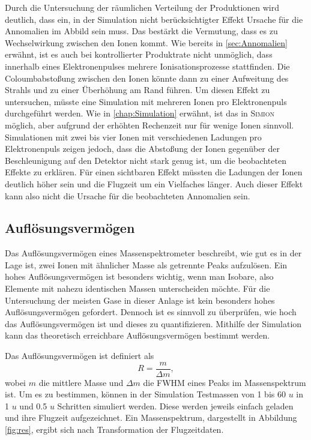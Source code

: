 Durch die Untersuchung der räumlichen Verteilung der Produktionen wird deutlich, dass ein, in der Simulation nicht berücksichtigter Effekt Ursache für die Annomalien im Abbild sein muss. Das bestärkt die Vermutung, dass es zu Wechselwirkung zwischen den Ionen kommt. Wie bereits in \ref{sec:Annomalien} erwähnt, ist es auch bei kontrollierter Produktrate nicht unmöglich, dass innerhalb eines Elektronenpulses mehrere Ionisationsprozesse stattfinden. Die Coloumbabstoßung zwischen den Ionen könnte dann zu einer Aufweitung des Strahls und zu einer Überhöhung am Rand führen. Um diesen Effekt zu untersuchen, müsste eine Simulation mit mehreren Ionen pro Elektronenpuls durchgeführt werden. Wie in \ref{chap:Simulation} erwähnt, ist das in \textsc{Simion} möglich, aber aufgrund der erhöhten Rechenzeit nur für wenige Ionen sinnvoll. Simulationen mit zwei bis vier Ionen mit verschiedenen Ladungen pro Elektronenpuls zeigen jedoch, dass die Abstoßung der Ionen gegenüber der Beschleunigung auf den Detektor nicht stark genug ist, um die beobachteten Effekte zu erklären. Für einen sichtbaren Effekt müssten die Ladungen der Ionen deutlich höher sein und die Flugzeit um ein Vielfaches länger. Auch dieser Effekt kann also nicht die Ursache für die beobachteten Annomalien sein.

\label{sec:delay}
\subsection{Auflösungsvermögen}
Das Auflösungsvermögen eines Massenspektrometer beschreibt, wie gut es in der Lage ist, zwei Ionen mit ähnlicher Masse als getrennte Peaks aufzulösen. Ein hohes Auflösungsvermögen ist besonders wichtig, wenn man Isobare, also Elemente mit nahezu identischen Massen unterscheiden möchte. Für die Untersuchung der meisten Gase in dieser Anlage ist kein besonders hohes Auflösungsvermögen gefordert. Dennoch ist es sinnvoll zu überprüfen, wie hoch das Auflösungsvermögen ist und dieses zu quantifizieren. Mithilfe der Simulation kann das theoretisch erreichbare Auflösungsvermögen bestimmt werden. 

Das Auflösungsvermögen ist definiert als 
\begin{equation}
    R = \frac{m}{\Delta m},
    \label{eq:res}
\end{equation}
wobei $m$ die mittlere Masse und $\Delta m$ die FWHM eines Peaks im Massenspektrum ist. Um es zu bestimmen, können in der Simulation Testmassen von 1 bis 60 $u$ in 1 $u$ und 0.5 $u$ Schritten simuliert werden. Diese werden jeweils einfach geladen und ihre Flugzeit aufgezeichnet. Ein Massenspektrum, dargestellt in Abbildung \ref{fig:res}, ergibt sich nach Transformation der Flugzeitdaten.

